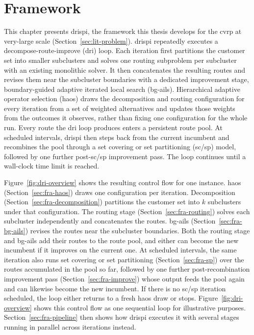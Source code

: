 \chapter{Framework}\label{chapter:framework}
This chapter presents \gls{drispi}, the framework this thesis develops for the \gls{cvrp} at very-large scale (Section~\ref{sec:lit-problem}). \gls{drispi} repeatedly executes a decompose-route-improve (\gls{dri}) loop. Each iteration first partitions the customer set into smaller subclusters and solves one routing subproblem per subcluster with an existing monolithic solver. It then concatenates the resulting routes and revises them near the subcluster boundaries with a dedicated improvement stage, boundary-guided adaptive iterated local search (\gls{bg-ails}). Hierarchical adaptive operator selection (\gls{haos}) draws the decomposition and routing configuration for every iteration from a set of weighted alternatives and updates those weights from the outcomes it observes, rather than fixing one configuration for the whole run. Every route the \gls{dri} loop produces enters a persistent route pool. At scheduled intervals, \gls{drispi} then steps back from the current incumbent and recombines the pool through a set covering or set partitioning (\gls{sc}/\gls{sp}) model, followed by one further post-\gls{sc}/\gls{sp} improvement pass. The loop continues until a wall-clock time limit is reached.

Figure~\ref{fig:dri-overview} shows the resulting control flow for one instance. \gls{haos} (Section~\ref{sec:fra-haos}) draws one configuration per iteration. Decomposition (Section~\ref{sec:fra-decomposition}) partitions the customer set into $k$ subclusters under that configuration. The routing stage (Section~\ref{sec:fra-routing}) solves each subcluster independently and concatenates the routes. \gls{bg-ails} (Section~\ref{sec:fra-bg-ails}) revises the routes near the subcluster boundaries. Both the routing stage and \gls{bg-ails} add their routes to the route pool, and either can become the new incumbent if it improves on the current one. At scheduled intervals, the same iteration also runs set covering or set partitioning (Section~\ref{sec:fra-sp}) over the routes accumulated in the pool so far, followed by one further post-recombination improvement pass (Section~\ref{sec:fra-improve}) whose output feeds the pool again and can likewise become the new incumbent. If there is no \gls{sc}/\gls{sp} iteration scheduled, the loop either returns to a fresh \gls{haos} draw or stops. Figure~\ref{fig:dri-overview} shows this control flow as one sequential loop for illustrative purposes. Section~\ref{sec:fra-pipeline} then shows how \gls{drispi} executes it with several stages running in parallel across iterations instead.

